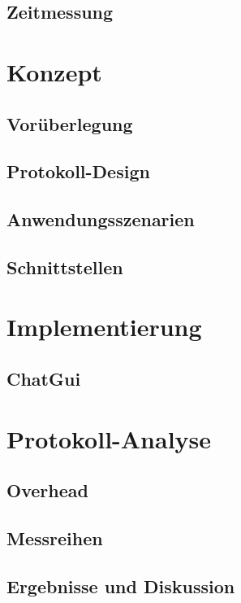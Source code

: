 \documentclass[
    11pt, %
    DIV=11,
    ngerman, %
    a4paper, %
    oneside, %
    titlepage, %
    parskip=half, %
    headings=normal, %
    listof=totoc, %
    bibliography=totoc, %
    index=totoc, %
    captions=tableheading, %
    final %
]{scrreprt}
\begin{document}
	\section{Zeitmessung}
		
	
\chapter{Konzept} \label{sec:Konzept}
	
	\section{Vorüberlegung} \label{sec:Vorueberlegung}
		
	\section{Protokoll-Design} \label{sec:ProtokolDesign}
		
	\section{Anwendungsszenarien}\label{sec:Anwendungsszenarien}
		
	\section{Schnittstellen}
		
	
\chapter{Implementierung} \label{sec:Implementierung}
	
	\section{ChatGui}
	
	
\chapter{Protokoll-Analyse}	
	
	\section{Overhead}
		
	\section{Messreihen}
		
	\section{Ergebnisse und Diskussion}
		
	
\end{document}
